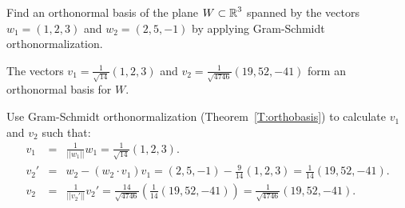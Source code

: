 \documentclass{ximera}
\begin{document}
\begin{exercise} \label{c7.5.2}
Find an orthonormal basis of the plane $W\subset\mbox{$\mathbb{R}$}^3$ spanned by the
vectors $w_1=(1,2,3)$ and $w_2=(2,5,-1)$ by applying Gram-Schmidt
orthonormalization.

\begin{solution}

\ans The vectors $v_1 = \frac{1}{\sqrt{14}}(1,2,3)$ and
$v_2 = \frac{1}{\sqrt{4746}}(19,52,-41)$ form an orthonormal basis
for $W$.

\soln Use Gram-Schmidt orthonormalization
(Theorem~\ref{T:orthobasis}) to calculate $v_1$ and $v_2$ such that:
\[
\begin{array}{rcl}
v_1 & = & \frac{1}{||w_1||}w_1 = \frac{1}{\sqrt{14}}(1,2,3). \\
v_2' & = & w_2 - (w_2 \cdot v_1)v_1 = (2,5,-1) -
\frac{9}{14}(1,2,3) = \frac{1}{14}(19,52,-41). \\
v_2 & = & \frac{1}{||v_2'||}v_2' = \frac{14}{\sqrt{4746}}
\left(\frac{1}{14}(19,52,-41)\right) = \frac{1}{\sqrt{4746}}
(19,52,-41).
\end{array}
\]

\end{solution}
\end{exercise}
\end{document}
